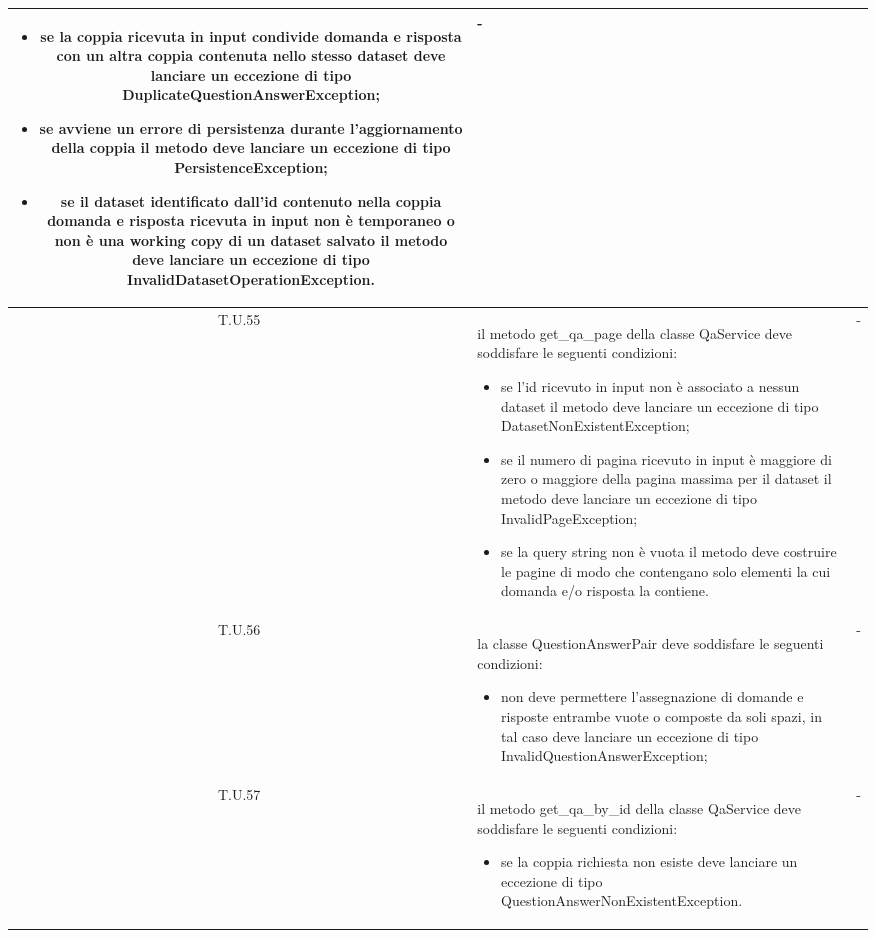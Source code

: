\begin{tabularx}{\textwidth}{|c|X|c|}
\begin{itemize}
        \item se la coppia ricevuta in input condivide domanda e risposta con un altra coppia contenuta nello stesso dataset deve lanciare un eccezione di tipo DuplicateQuestionAnswerException;
        \item se avviene un errore di persistenza durante l'aggiornamento della coppia il metodo deve lanciare un eccezione di tipo PersistenceException;
        \item se il dataset identificato dall'id contenuto nella coppia domanda e risposta ricevuta in input non è temporaneo o non è una working copy di un dataset salvato il metodo deve lanciare un eccezione di tipo InvalidDatasetOperationException.
    \end{itemize} & - \\
    \hline 
    \label{tu:tu55} T.U.55 & il metodo get\_qa\_page della classe QaService deve soddisfare le seguenti condizioni:
    \begin{itemize}
        \item se l'id ricevuto in input non è associato a nessun dataset il metodo deve lanciare un eccezione di tipo DatasetNonExistentException;
        \item se il numero di pagina ricevuto in input è maggiore di zero o maggiore della pagina massima per il dataset il metodo deve lanciare un eccezione di tipo InvalidPageException;
        \item se la query string non è vuota il metodo deve costruire le pagine di modo che contengano solo elementi la cui domanda e/o risposta la contiene.
    \end{itemize} & - \\
    \hline 
    \label{tu:tu56} T.U.56 & la classe QuestionAnswerPair deve soddisfare le seguenti condizioni:
    \begin{itemize}
        \item non deve permettere l'assegnazione di domande e risposte entrambe vuote o composte da soli spazi, in tal caso deve lanciare un eccezione di tipo InvalidQuestionAnswerException; 
    \end{itemize} & - \\
    \hline 
    \label{tu:tu57} T.U.57 & il metodo get\_qa\_by\_id della classe QaService deve soddisfare le seguenti condizioni:
    \begin{itemize}
        \item se la coppia richiesta non esiste deve lanciare un eccezione di tipo QuestionAnswerNonExistentException.
    \end{itemize} & - \\

\end{tabularx}
